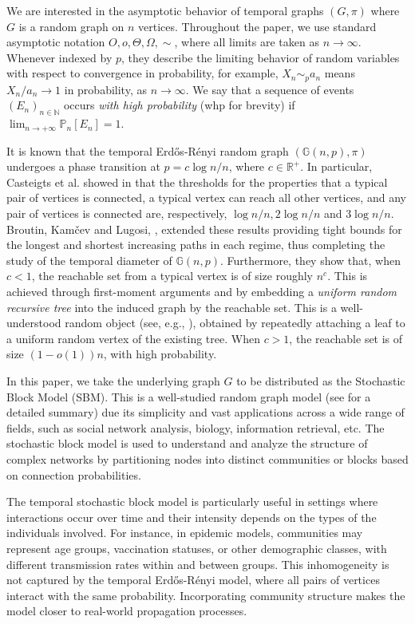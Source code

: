 \documentclass[11pt]{article}
\numberwithin{equation}{section}
\theoremstyle{definition}
\newcommand\bG{{\mathbb G}}
\newcommand\bR{{\mathbb R}}
\begin{document}
We are interested in the asymptotic behavior of temporal graphs $(G,\pi)$ where $G$ is a random graph on $n$ vertices. Throughout the paper, we use standard asymptotic notation $O, o, \Theta, \Omega, \sim$, where all limits are taken as $n\to \infty$. Whenever indexed by $p$, they describe the limiting behavior of random variables with respect to convergence in probability, for example, $X_n \sim_p a_n$ means $X_n/a_n \to 1$ in probability, as $n\to \infty.$ We say that a sequence of events $(E_n)_{n\in \mathbb{N}}$ occurs \emph{with high probability} (whp for brevity) if $\lim_{n\to +\infty}\mathbb{P}_n[E_n] = 1$.

It is known that the temporal Erd\H os-R\'enyi random graph $(\bG(n,p
),\pi)$ undergoes a phase transition at $p= c\log n /n$, where $c \in \bR^+$. In particular, Casteigts et al. showed in \cite{CRRZ24} that the thresholds for the properties that a typical pair of vertices is connected, a typical vertex can reach all other vertices, and any pair of vertices is connected are, respectively, $\log n/n, 2\log n/n$ and $3\log n/n$. Broutin, Kam\v  cev and Lugosi, \cite{BKL24}, extended these results providing tight bounds for the longest and shortest increasing paths in each regime, thus completing the study of the temporal diameter of $\bG(n,p)$. Furthermore, they show that, when $c<1$, 
the reachable set from a typical vertex 
is of size roughly $n^c$. This is achieved through first-moment arguments and by embedding a \emph{uniform random recursive tree} into the induced graph by the reachable set. This is a well-understood random object (see, e.g., \cite{P94, J05, DL95, AL18, D87}), obtained by repeatedly attaching a leaf to a uniform random vertex of the existing tree. When $c>1$,  the reachable set is of size $(1-o(1))n$, with high probability.

In this paper, we take the underlying graph $G$ to be distributed as the Stochastic Block Model (SBM). This is a well-studied random graph model (see \cite{A18} for a detailed summary) due its simplicity and vast applications across a wide range of fields, such as social network analysis, biology, information retrieval, etc. The stochastic block model is used to understand and analyze the structure of complex networks by partitioning nodes into distinct communities or blocks based on connection probabilities. 

The temporal stochastic block model is particularly useful in settings where interactions occur over time and their intensity depends on the types of the individuals involved. For instance, in epidemic models, communities may represent age groups, vaccination statuses, or other demographic classes, with different transmission rates within and between groups. %
This inhomogeneity is not captured by the temporal Erd\H os-R\' enyi model, where all pairs of vertices interact with the same probability. Incorporating community structure makes the model closer to real-world propagation processes.
\end{document}
